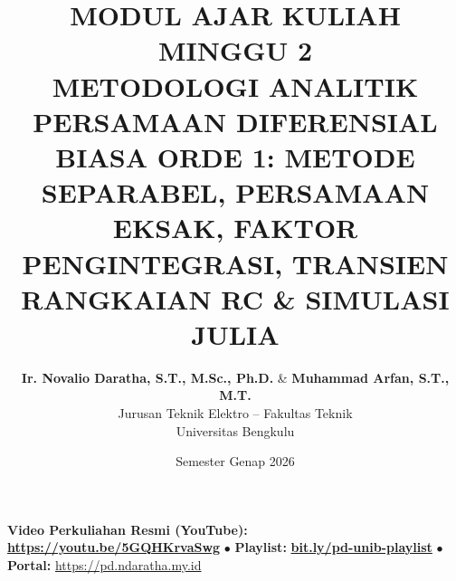 \documentclass[11pt,a4paper]{article}
\title{\textbf{\Large MODUL AJAR KULIAH MINGGU 2}\\[0.3cm]
\textbf{\LARGE METODOLOGI ANALITIK PERSAMAAN DIFERENSIAL BIASA ORDE 1: METODE SEPARABEL, PERSAMAAN EKSAK, FAKTOR PENGINTEGRASI, TRANSIEN RANGKAIAN RC \& SIMULASI JULIA}}
\author{\textbf{Ir. Novalio Daratha, S.T., M.Sc., Ph.D.} \& \textbf{Muhammad Arfan, S.T., M.T.} \\ 
Jurusan Teknik Elektro -- Fakultas Teknik \\ 
Universitas Bengkulu}
\date{Semester Genap 2026}
\theoremstyle{definition}
\begin{document}
\maketitle
\begin{center}
  \vspace{-0.25cm}
  \begin{tcolorbox}[colback=red!4!white,colframe=red!75!black,boxrule=0.5pt,arc=2pt,left=6pt,right=6pt,top=3pt,bottom=3pt,width=0.98\textwidth]
    \centering\footnotesize
    \textbf{Video Perkuliahan Resmi (YouTube):} {\color{red!80!black}\textbf{\url{https://youtu.be/5GQHKrvaSwg}}} \quad $\bullet$ \quad \textbf{Playlist:} \href{https://www.youtube.com/playlist?list=PLS5oOZWXZeTw}{\color{blue!80!black}\textbf{bit.ly/pd-unib-playlist}} \quad $\bullet$ \quad \textbf{Portal:} \url{https://pd.ndaratha.my.id}
  \end{tcolorbox}
  \vspace{-0.15cm}
\end{center}
\end{document}
